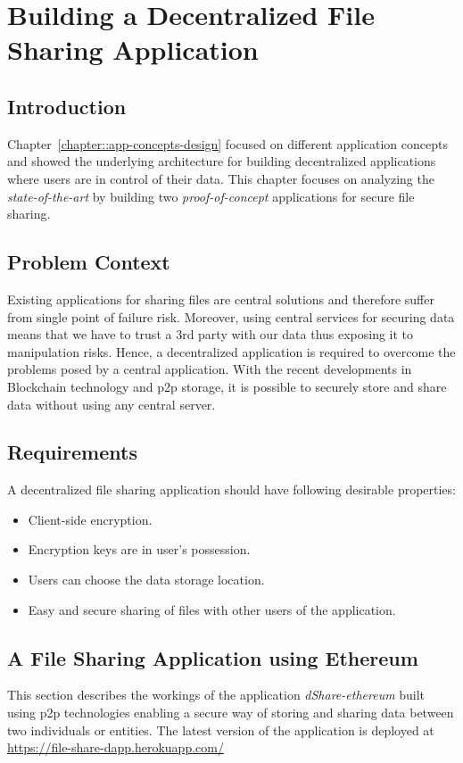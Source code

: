\chapter{Building a Decentralized File Sharing Application}\label{chapter:building-dapp}

	\section{Introduction}
	Chapter~\ref{chapter::app-concepts-design} focused on different application concepts and showed the underlying architecture for building decentralized applications where users are in control of their data. This chapter focuses on analyzing the \textit{state-of-the-art} by building two \textit{proof-of-concept} applications for secure file sharing.
	
	\section{Problem Context}
	Existing applications for sharing files are central solutions and therefore suffer from single point of failure risk. Moreover, using central services for securing data means that we have to trust a 3rd party with our data thus exposing it to manipulation risks. Hence, a decentralized application is required to overcome the problems posed by a central application. With the recent developments in Blockchain technology and p2p storage, it is possible to securely store and share data without using any central server.
	
	\section{Requirements}
	A decentralized file sharing application should have following desirable properties:
	\begin{itemize}
		\item Client-side encryption.
		\item Encryption keys are in user's possession.
		\item Users can choose the data storage location.
		\item Easy and secure sharing of files with other users of the application.
	\end{itemize}

	\section{A File Sharing Application using Ethereum}
	This section describes the workings of the application \textit{dShare-ethereum}\cite{harsh_kedia_2019_3359852} built using p2p technologies enabling a secure way of storing and sharing data between two individuals or entities. The latest version of the application is deployed at \url{https://file-share-dapp.herokuapp.com/}
	
